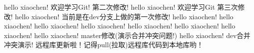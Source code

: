 hello xiaochen! 欢迎学习Git! 第二次修改!
hello xiaochen! 欢迎学习Git  第三次修改!
hello xiaochen!  当前是在dev分支上做的第一次修改!
hello xiaochen!
hello xiaochen!
hello xiaochen!
hello xiaochen!
hello xiaochen!
hello xiaochen!
hello xiaochen!
hello xiaochen!  master修改(演示合并冲突问题!)
hello xiaochen! dev合并冲突演示!
远程库更新啦！记得pull(拉取)远程库代码到本地库哟！
